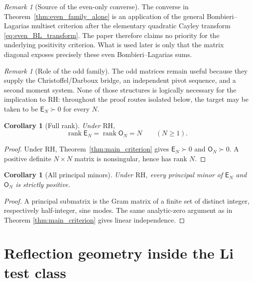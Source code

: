 \documentclass[11pt]{amsart}
\numberwithin{equation}{section}
\theoremstyle{plain}
\newtheorem{corollary}[theorem]{Corollary}
\theoremstyle{definition}
\theoremstyle{remark}
\newtheorem{remark}[theorem]{Remark}
\newcommand{\RH}{\mathrm{RH}}
\newcommand{\E}{\mathsf E}
\newcommand{\Omat}{\mathsf O}
\newcommand{\rank}{\operatorname{rank}}
\begin{document}
\begin{remark}[Source of the even-only converse]
\label{rem:even_only_source}
The converse in Theorem~\ref{thm:even_family_alone} is an application of the general
Bombieri--Lagarias multiset criterion after the elementary quadratic Cayley transform
\eqref{eq:even_BL_transform}.  The paper therefore claims no priority for the underlying
positivity criterion.  What is used later is only that the matrix diagonal exposes precisely these
even Bombieri--Lagarias sums.
\end{remark}

\begin{remark}[Role of the odd family]
\label{rem:odd_not_needed_RH}
The odd matrices remain useful because they supply the Christoffel/Darboux bridge, an independent
pivot sequence, and a second moment system.  None of those structures is logically necessary for the
implication to \(\RH\): throughout the proof routes isolated below, the target may be taken to be
\(\E_N\succ0\) for every \(N\).
\end{remark}

\begin{corollary}[Full rank]
\label{cor:full_rank}
Under $\RH$,
\begin{equation}
\rank \E_N=\rank \Omat_N=N
\qquad(N\ge1).
\label{eq:full_rank}
\end{equation}
\end{corollary}

\begin{proof}
Under \(\RH\), Theorem~\ref{thm:main_criterion} gives
\(\E_N\succ0\) and \(\Omat_N\succ0\).  A positive definite \(N\times N\)
matrix is nonsingular, hence has rank \(N\).
\end{proof}

\begin{corollary}[All principal minors]
\label{cor:all_principal_minors}
Under $\RH$, every principal minor of $\E_N$ and $\Omat_N$ is strictly positive.
\end{corollary}

\begin{proof}
A principal submatrix is the Gram matrix of a finite set of distinct integer, respectively half-integer, sine modes. The same analytic-zero argument as in Theorem \ref{thm:main_criterion} gives linear independence.
\end{proof}

\section{Reflection geometry inside the Li test class}
\label{sec:reflection_compression}
\end{document}
